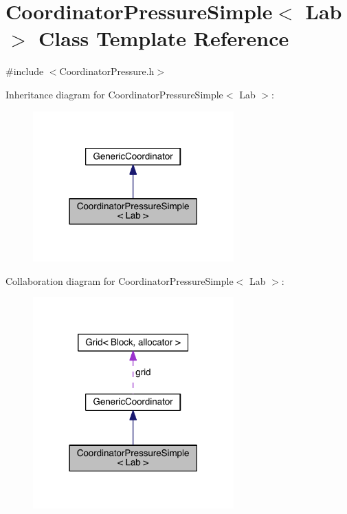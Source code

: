 \hypertarget{class_coordinator_pressure_simple}{}\section{Coordinator\+Pressure\+Simple$<$ Lab $>$ Class Template Reference}
\label{class_coordinator_pressure_simple}


{\ttfamily \#include $<$Coordinator\+Pressure.\+h$>$}



Inheritance diagram for Coordinator\+Pressure\+Simple$<$ Lab $>$\+:\nopagebreak
\begin{figure}[H]
\begin{center}
\leavevmode
\includegraphics[width=219pt]{d1/d40/class_coordinator_pressure_simple__inherit__graph}
\end{center}
\end{figure}


Collaboration diagram for Coordinator\+Pressure\+Simple$<$ Lab $>$\+:\nopagebreak
\begin{figure}[H]
\begin{center}
\leavevmode
\includegraphics[width=219pt]{d1/db1/class_coordinator_pressure_simple__coll__graph}
\end{center}
\end{figure}
